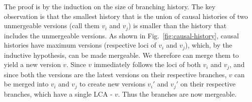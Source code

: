 The proof is by the induction on the size of branching history. The
key observation is that the smallest history that is the union of
causal histories of two unmergeable versions (call them $v_i$ and
$v_j$) is smaller than the history that includes the unmergeable
versions. As shown in Fig.~\ref{fig:causal-history}, causal
histories have maximum versions (respective loci of $v_i$ and $v_j$),
which, by the inductive hypothesis, can be made mergeable. We
therefore can merge them to yield a new version $v$. Since $v$
immediately follows the loci of both $v_i$ and $v_j$, and since both
the versions are the latest versions on their respective branches, $v$
can be merged into $v_i$ and $v_j$ to create new versions $v_i'$ and
$v_j'$ on their respective branches, which have a single LCA - $v$.
Thus the branches are now mergeable.


